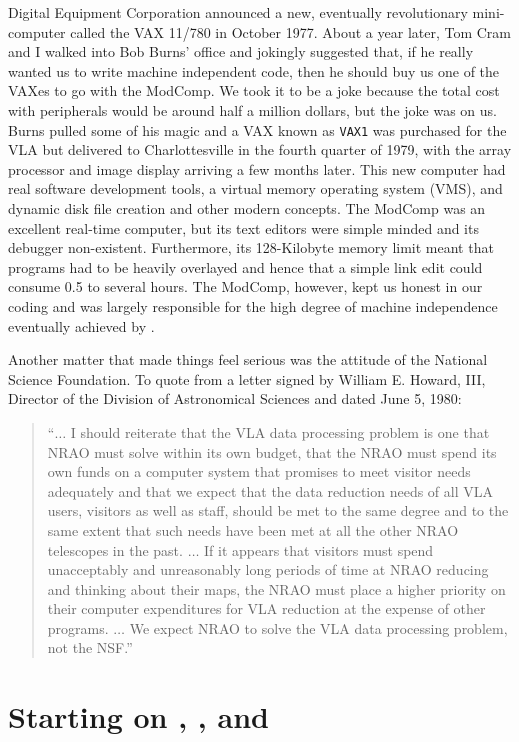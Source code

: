 Digital Equipment Corporation announced a new, eventually
revolutionary mini-computer called the VAX 11/780 in October 1977.
About a year later, Tom Cram and I walked into Bob Burns' office and
jokingly suggested that, if he really wanted us to write machine
independent code, then he should buy us one of the VAXes to go with
the ModComp.  We took it to be a joke because the total cost with
peripherals would be around half a million dollars, but the joke was
on us.  Burns pulled some of his magic and a VAX known as {\tt VAX1}
was purchased for the VLA but delivered to Charlottesville in the
fourth quarter of 1979, with the array processor and image display
arriving a few months later.  This new computer had real software
development tools, a virtual memory operating system (VMS), and
dynamic disk file creation and other modern concepts.  The ModComp was
an excellent real-time computer, but its text editors were simple
minded and its debugger non-existent. Furthermore, its 128-Kilobyte
memory limit meant that programs had to be heavily overlayed and hence
that a simple link edit could consume 0.5 to several hours.  The
ModComp, however, kept us honest in our coding and was largely
responsible for the high degree of machine independence eventually
achieved by \hbox{\AIPS}.

Another matter that made things feel serious was the attitude of the
National Science Foundation.  To quote from a letter signed by William
E. Howard, III, Director of the Division of Astronomical Sciences and
dated June 5, 1980:\vspace{-5pt}
\begin{quotation}
``$\ldots$ I should reiterate that the VLA data processing problem is
one that NRAO must solve within its own budget, that the NRAO must
spend its own funds on a computer system that promises to meet visitor
needs adequately and that we expect that the data reduction needs of
all VLA users, visitors as well as staff, should be met to the same
degree and to the same extent that such needs have been met at all the
other NRAO telescopes in the past.  $\ldots$ If it appears that
visitors must spend unacceptably and unreasonably long periods of time
at NRAO reducing and thinking about their maps, the NRAO must place a
higher priority on their computer expenditures for VLA reduction at
the expense of other programs.  $\ldots$ We expect NRAO to solve the
VLA data processing problem, not the NSF.''
\end{quotation}

\section{Starting on \VPOPS, \RANCID, and \AIPS}


